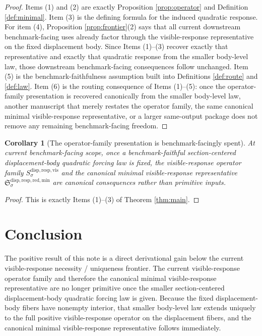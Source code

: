 \documentclass[11pt]{article}
\newcommand{\VisibleResponseOperator}[1]{S_{#1}^{\mathrm{disp,resp,vis}}}
\newcommand{\MinimalReducedStructure}{\mathfrak S^{\mathrm{disp,resp,red,min}}}
\newtheorem{corollary}{Corollary}
\begin{document}
\begin{proof}
Items (1) and (2) are exactly Proposition \ref{prop:operator} and Definition \ref{def:minimal}. Item (3) is the defining formula for the induced quadratic response. For item (4), Proposition \ref{prop:frontier}(2) says that all current downstream benchmark-facing uses already factor through the visible-response representative on the fixed displacement body. Since Items (1)--(3) recover exactly that representative and exactly that quadratic response from the smaller body-level law, those downstream benchmark-facing consequences follow unchanged. Item (5) is the benchmark-faithfulness assumption built into Definitions \ref{def:route} and \ref{def:law}. Item (6) is the routing consequence of Items (1)--(5): once the operator-family presentation is recovered canonically from the smaller body-level law, another manuscript that merely restates the operator family, the same canonical minimal visible-response representative, or a larger same-output package does not remove any remaining benchmark-facing freedom.
\end{proof}

\begin{corollary}[The operator-family presentation is benchmark-facingly spent]
\label{cor:spent}
At current benchmark-facing scope, once a benchmark-faithful section-centered displacement-body quadratic forcing law is fixed, the visible-response operator family \(\VisibleResponseOperator{\sigma}\) and the canonical minimal visible-response representative \(\MinimalReducedStructure_{\sigma}\) are canonical consequences rather than primitive inputs.
\end{corollary}

\begin{proof}
This is exactly Items (1)--(3) of Theorem \ref{thm:main}.
\end{proof}

\section{Conclusion}

The positive result of this note is a direct derivational gain below the current visible-response necessity / uniqueness frontier. The current visible-response operator family and therefore the canonical minimal visible-response representative are no longer primitive once the smaller section-centered displacement-body quadratic forcing law is given. Because the fixed displacement-body fibers have nonempty interior, that smaller body-level law extends uniquely to the full positive visible-response operator on the displacement fibers, and the canonical minimal visible-response representative follows immediately.
\end{document}
